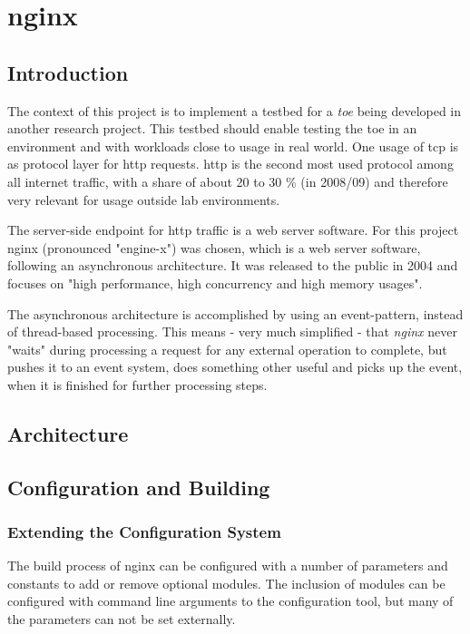 \chapter{nginx}

\section{Introduction}

The context of this project is to implement a testbed for a \textit{\gls{toe}} being developed in another research project. This testbed should enable testing the \gls{toe} in an environment and with workloads close to usage in real world. One usage of \gls{tcp} is as protocol layer for \gls{http} requests. \gls{http} is the second most used protocol among all internet traffic, with a share of about 20 to 30 \% (in 2008/09) \cite{internet_study} and therefore very relevant for usage outside lab environments. 

The server-side endpoint for \gls{http} traffic is a web server software. For this project nginx (pronounced "engine-x") was chosen, which is a web server software, following an asynchronous architecture. It was released to the public in 2004 and focuses on "high performance, high concurrency and high memory usages"\cite{aosa}.

The asynchronous architecture is accomplished by using an event-pattern, instead of thread-based processing. This means - very much simplified - that \textit{nginx} never "waits" during processing a request for any external operation to complete, but pushes it to an event system, does something other useful and picks up the event, when it is finished for further processing steps.

\section{Architecture}

\section{Configuration and Building}

\subsection{Extending the Configuration System}

The build process of nginx can be configured with a number of parameters and constants to add or remove optional modules. The inclusion of modules can be configured with command line arguments to the configuration tool, but many of the parameters can not be set externally.

